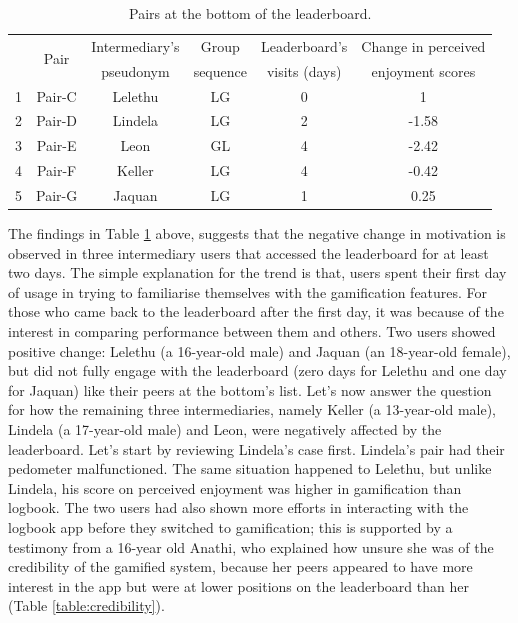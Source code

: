 \begin{table}[h!]
  \begin{center}
    \caption{Pairs at the bottom of the leaderboard.}
    \label{table:bottom}
	\begin{tabular}{|c|c|c|c|c|c|}
		\hline
		&\multirow{2}{*}{Pair}&Intermediary's  & Group &Leaderboard's& Change in perceived\\
         &&pseudonym&sequence&visits (days) &enjoyment scores\\	
		\hline
		1&Pair-C&Lelethu&LG&0&1\\
		\hline
		2&Pair-D&Lindela&LG&2&-1.58\\
		\hline
		3&Pair-E&Leon&GL&4&-2.42\\
		\hline
		4&Pair-F&Keller&LG&4&-0.42\\
	\hline
		5&Pair-G&Jaquan&LG&1&0.25\\
	\hline
	\end{tabular}
  \end{center}
\end{table}

The findings in Table \ref{table:bottom} above, suggests that the negative change in motivation is observed in three intermediary users that accessed the leaderboard for at least two days. The simple explanation for the trend is that, users spent their first day of usage in trying to familiarise themselves with the gamification features. For those who came back to the leaderboard after the first day, it was because of the interest in comparing performance between them and others. Two users showed positive change: Lelethu (a 16-year-old male) and Jaquan (an 18-year-old female), but did not fully engage with the leaderboard (zero days for Lelethu and one day for Jaquan) like their peers at the bottom's list. Let's now answer the question for how the remaining three intermediaries, namely Keller (a 13-year-old male), Lindela (a 17-year-old male) and Leon, were negatively affected by the leaderboard. Let's start by reviewing Lindela's case first. Lindela's pair had their pedometer malfunctioned. The same situation happened to Lelethu, but unlike Lindela, his score on perceived enjoyment was higher in gamification than logbook. The two users had also shown more efforts in interacting with the logbook app before they switched to gamification; this is supported by a testimony from a 16-year old Anathi, who explained how unsure she was of the credibility of the gamified system, because her peers appeared to have more interest in the app but were at lower positions on the leaderboard than her (Table \ref{table:credibility}).

